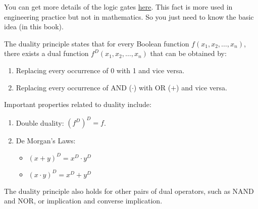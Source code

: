     \begin{remark}
        You can get more details of the logic gates \href{https://www.wikiwand.com/simple/Logic_gate}{here}. This fact is more used in engineering practice but not in mathematics. So you
        just need to know the basic idea (in this book).
    \end{remark}

    \begin{theorem}  
        The duality principle states that for every Boolean function $f(x_1, x_2, \ldots, x_n)$, there exists a dual function $f^D(x_1, x_2, \ldots, x_n)$ that can be obtained by:
        \begin{enumerate}
            \item Replacing every occurrence of 0 with 1 and vice versa.
            \item Replacing every occurrence of AND ($\cdot$) with OR ($+$) and vice versa.
        \end{enumerate}
        Important properties related to duality include:
        \begin{enumerate}
            \item Double duality: $(f^D)^D = f$.
            \item De Morgan's Laws:
            \begin{itemize}
                \item $(x + y)^D = x^D \cdot y^D$
                \item $(x \cdot y)^D = x^D + y^D$
            \end{itemize}
        \end{enumerate}

        The duality principle also holds for other pairs of dual operators, such as NAND and NOR, or implication and converse implication.
    \end{theorem}    
    
